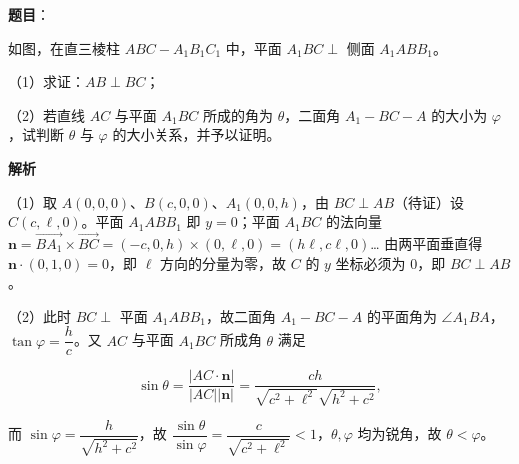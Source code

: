 \begin{answer}

\textbf{题目}：

如图，在直三棱柱 $ABC-A_1B_1C_1$ 中，平面 $A_1BC\perp$ 侧面 $A_1ABB_1$。

（1）求证：$AB\perp BC$；

（2）若直线 $AC$ 与平面 $A_1BC$ 所成的角为 $\theta$，二面角 $A_1-BC-A$ 的大小为 $\varphi$，试判断 $\theta$ 与 $\varphi$ 的大小关系，并予以证明。
\nopagebreak[4]
\begin{center}\end{center}
\nopagebreak[4]
\textbf{解析}

（1）取 $A(0,0,0)$、$B(c,0,0)$、$A_1(0,0,h)$，由 $BC\perp AB$（待证）设 $C(c,\ell,0)$。平面 $A_1ABB_1$ 即 $y=0$；平面 $A_1BC$ 的法向量 $\boldsymbol n=\overrightarrow{BA_1}\times\overrightarrow{BC}=(-c,0,h)\times(0,\ell,0)=(h\ell,c\ell,0)$… 由两平面垂直得 $\boldsymbol n\cdot(0,1,0)=0$，即 $\ell$ 方向的分量为零，故 $C$ 的 $y$ 坐标必须为 $0$，即 $BC\perp AB$。

（2）此时 $BC\perp$ 平面 $A_1ABB_1$，故二面角 $A_1-BC-A$ 的平面角为 $\angle A_1BA$，$\tan\varphi=\dfrac h{c}$。又 $AC$ 与平面 $A_1BC$ 所成角 $\theta$ 满足

\nopagebreak[4]
\[\sin\theta=\frac{|AC\cdot\boldsymbol n|}{|AC||\boldsymbol n|}=\frac{ch}{\sqrt{c^2+\ell^2}\sqrt{h^2+c^2}},\]

而 $\sin\varphi=\dfrac h{\sqrt{h^2+c^2}}$，故 $\dfrac{\sin\theta}{\sin\varphi}=\dfrac c{\sqrt{c^2+\ell^2}}<1$，$\theta,\varphi$ 均为锐角，故 $\theta<\varphi$。


\end{answer}
